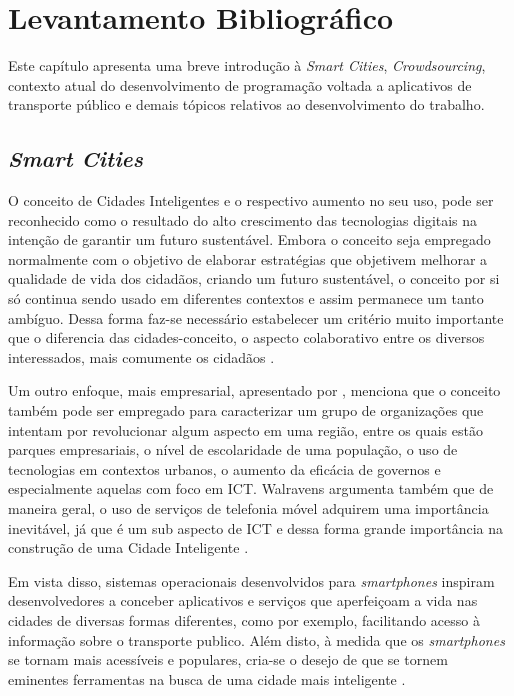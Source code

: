 \chapter{Levantamento Bibliográfico}\label{cap:levbibliog}

Este capítulo apresenta uma breve introdução à \textit{Smart Cities}, \textit{Crowdsourcing}, contexto atual do desenvolvimento de programação voltada a aplicativos de transporte público e demais tópicos relativos ao desenvolvimento do trabalho.

\section{\textit{Smart Cities}}

O conceito de Cidades Inteligentes e o respectivo aumento no seu uso, pode ser reconhecido como o resultado do alto crescimento das tecnologias digitais na intenção de garantir um futuro sustentável. Embora o conceito seja empregado normalmente com o objetivo de elaborar estratégias que objetivem melhorar a qualidade de vida dos cidadãos, criando um futuro sustentável, o conceito por si só continua sendo usado em diferentes contextos e assim permanece um tanto ambíguo. Dessa forma faz-se necessário estabelecer um critério muito importante que o diferencia das cidades-conceito, o aspecto colaborativo entre os diversos interessados, mais comumente os cidadãos \cite{schuurman}. 

Um outro enfoque, mais empresarial, apresentado por , menciona que o conceito também pode ser empregado para caracterizar um grupo de organizações que intentam por revolucionar algum aspecto em uma região, entre os quais estão parques empresariais, o nível de escolaridade de uma população, o uso de tecnologias em contextos urbanos, o aumento da eficácia de governos e especialmente aquelas com foco em ICT. Walravens argumenta também que de maneira geral, o uso de serviços de telefonia móvel adquirem uma importância inevitável, já que é um sub aspecto de ICT e dessa forma grande importância na construção de uma Cidade Inteligente \cite{walravens}.

Em vista disso, sistemas operacionais desenvolvidos para \emph{smartphones} inspiram desenvolvedores a conceber aplicativos e serviços que aperfeiçoam a vida nas cidades de diversas formas diferentes, como por exemplo, facilitando acesso à informação sobre o transporte publico. Além disto, à medida que os \emph{smartphones} se tornam mais acessíveis e populares, cria-se o desejo de que se tornem eminentes ferramentas na busca de uma cidade mais inteligente \cite{walravens}.

